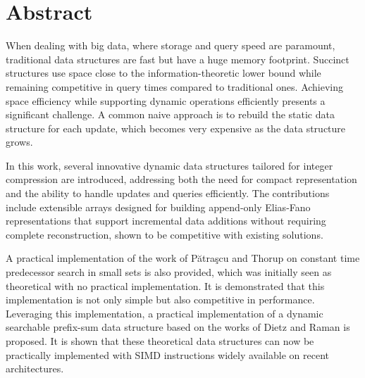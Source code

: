 \chapter*{\Large \center Abstract}

When dealing with big data, where storage and query speed are paramount, traditional data structures are fast but have a huge memory footprint. Succinct structures use space close to the information-theoretic lower bound while remaining competitive in query times compared to traditional ones. Achieving space efficiency while supporting dynamic operations efficiently presents a significant challenge. A common naive approach is to rebuild the static data structure for each update, which becomes very expensive as the data structure grows. 

In this work, several innovative dynamic data structures tailored for integer compression are introduced, addressing both the need for compact representation and the ability to handle updates and queries efficiently. The contributions include extensible arrays designed for building append-only Elias-Fano representations that support incremental data additions without requiring complete reconstruction, shown to be competitive with existing solutions.

A practical implementation of the work of Pătraşcu and Thorup \cite{Patrascu_2006} on constant time predecessor search in small sets is also provided, which was initially seen as theoretical with no practical implementation. It is demonstrated that this implementation is not only simple but also competitive in performance. Leveraging this implementation, a practical implementation of a dynamic searchable prefix-sum data structure based on the works of Dietz \cite{Dietz_1989} and Raman \cite{Raman_2001} is proposed. It is shown that these theoretical data structures can now be practically implemented with SIMD instructions widely available on recent architectures.